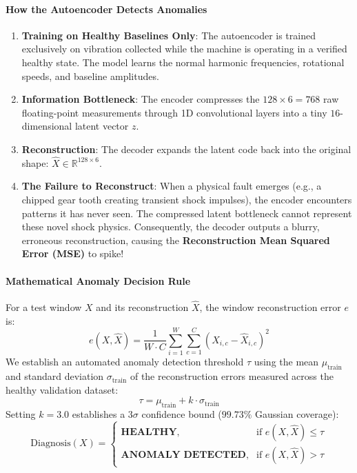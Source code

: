 \paragraph{How the Autoencoder Detects Anomalies}
\begin{enumerate}
    \item \textbf{Training on Healthy Baselines Only}: The autoencoder is trained exclusively on vibration collected while the machine is operating in a verified healthy state. The model learns the normal harmonic frequencies, rotational speeds, and baseline amplitudes.
    \item \textbf{Information Bottleneck}: The encoder compresses the $128 \times 6 = 768$ raw floating-point measurements through 1D convolutional layers into a tiny $16$-dimensional latent vector $z$.
    \item \textbf{Reconstruction}: The decoder expands the latent code back into the original shape: $\hat{X} \in \mathbb{R}^{128 \times 6}$.
    \item \textbf{The Failure to Reconstruct}: When a physical fault emerges (e.g., a chipped gear tooth creating transient shock impulses), the encoder encounters patterns it has never seen. The compressed latent bottleneck cannot represent these novel shock physics. Consequently, the decoder outputs a blurry, erroneous reconstruction, causing the \textbf{Reconstruction Mean Squared Error (MSE)} to spike!
\end{enumerate}

\paragraph{Mathematical Anomaly Decision Rule}
For a test window $X$ and its reconstruction $\hat{X}$, the window reconstruction error $e$ is:
\begin{equation}
e(X, \hat{X}) = \frac{1}{W \cdot C} \sum_{i=1}^{W} \sum_{c=1}^{C} \left( X_{i,c} - \hat{X}_{i,c} \right)^2\label{eq:reconstruction_error}
\end{equation}
We establish an automated anomaly detection threshold $\tau$ using the mean $\mu_{\text{train}}$ and standard deviation $\sigma_{\text{train}}$ of the reconstruction errors measured across the healthy validation dataset:
\begin{equation}
\tau = \mu_{\text{train}} + k \cdot \sigma_{\text{train}}\label{eq:anomaly_threshold}
\end{equation}
Setting $k = 3.0$ establishes a $3\sigma$ confidence bound ($99.73\%$ Gaussian coverage):
\begin{equation}
\text{Diagnosis}(X) = \begin{cases}
\textbf{HEALTHY}, & \text{if } e(X, \hat{X}) \le \tau \\
\textbf{ANOMALY DETECTED}, & \text{if } e(X, \hat{X}) > \tau
\end{cases}
\end{equation}

